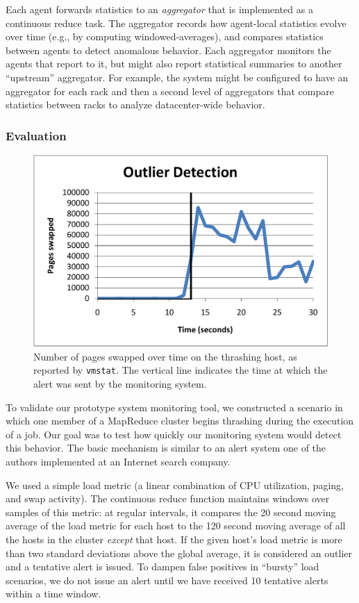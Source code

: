 Each agent forwards statistics to an \emph{aggregator} that is implemented as a
continuous reduce task. The aggregator records how agent-local statistics evolve
over time (e.g., by computing windowed-averages), and compares statistics
between agents to detect anomalous behavior. Each aggregator monitors the agents
that report to it, but might also report statistical summaries to another
``upstream'' aggregator. For example, the system might be configured to have an
aggregator for each rack and then a second level of aggregators that compare
statistics between racks to analyze datacenter-wide behavior.

\subsubsection{Evaluation}
\begin{figure}[t]
\ssp
  \centering
  \includegraphics[scale=0.6]{figures/continue.pdf}
  \caption{Number of pages swapped over time on the thrashing host, as reported
    by \texttt{vmstat}.  The vertical line indicates the time at which the alert
    was sent by the monitoring system.}
\label{fig:outlier}
\end{figure}

To validate our prototype system monitoring tool, we constructed a
scenario in which one member of a MapReduce cluster begins thrashing
during the execution of a job. Our goal was to test how quickly our
monitoring system would detect this behavior. The basic mechanism is
similar to an alert system one of the authors implemented at an
Internet search company.

We used a simple load metric (a linear combination of CPU utilization,
paging, and swap activity). The continuous reduce function maintains
windows over samples of this metric: at regular intervals, it
compares the 20 second moving average of the load metric for each host
to the 120 second moving average of all the hosts in the cluster
\emph{except} that host.  If the given host's load metric is more
than two standard deviations above the global average, it is
considered an outlier and a tentative alert is issued.  To dampen
false positives in ``bursty'' load scenarios, we do not issue an alert
until we have received 10 tentative alerts within a time window.

